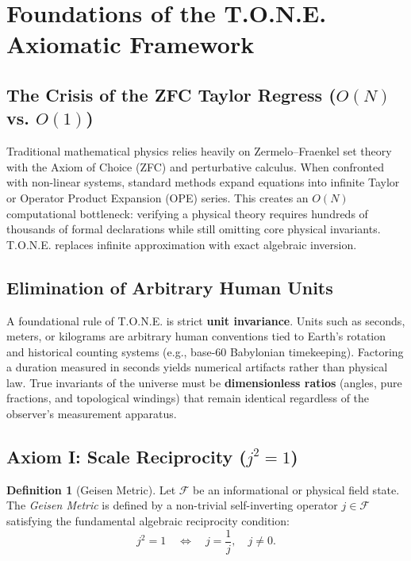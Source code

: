 \documentclass[11pt,a4paper,oneside]{article}
\theoremstyle{definition}
\newtheorem{definition}{Definition}[section]
\begin{document}
\newpage
\tableofcontents
\newpage

\section{Foundations of the T.O.N.E. Axiomatic Framework}

\subsection{The Crisis of the ZFC Taylor Regress ($O(N)$ vs. $O(1)$)}
Traditional mathematical physics relies heavily on Zermelo–Fraenkel set theory with the Axiom of Choice (ZFC) and perturbative calculus. When confronted with non-linear systems, standard methods expand equations into infinite Taylor or Operator Product Expansion (OPE) series. This creates an $O(N)$ computational bottleneck: verifying a physical theory requires hundreds of thousands of formal declarations while still omitting core physical invariants. T.O.N.E. replaces infinite approximation with exact algebraic inversion.

\subsection{Elimination of Arbitrary Human Units}
A foundational rule of T.O.N.E. is strict \textbf{unit invariance}. Units such as seconds, meters, or kilograms are arbitrary human conventions tied to Earth's rotation and historical counting systems (e.g., base-60 Babylonian timekeeping). Factoring a duration measured in seconds yields numerical artifacts rather than physical law. True invariants of the universe must be \textbf{dimensionless ratios} (angles, pure fractions, and topological windings) that remain identical regardless of the observer's measurement apparatus.

\subsection{Axiom I: Scale Reciprocity ($j^2 = 1$)}
\begin{definition}[Geisen Metric]
Let $\mathcal{F}$ be an informational or physical field state. The \emph{Geisen Metric} is defined by a non-trivial self-inverting operator $j \in \mathcal{F}$ satisfying the fundamental algebraic reciprocity condition:
\begin{equation}
j^2 = 1 \quad \Longleftrightarrow \quad j = \frac{1}{j}, \quad j \neq 0.
\end{equation}
\end{definition}
\end{document}
